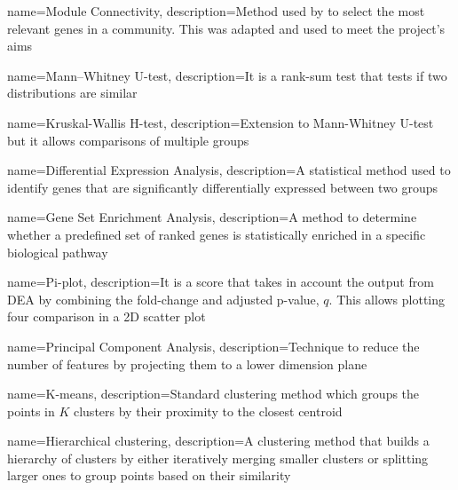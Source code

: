 {
    name=Module Connectivity,
    description={Method used by \citep{Care2019-ij} to select the most relevant genes in a community. This was adapted and used to meet the project's aims}
}

{
    name=Mann–Whitney U-test,
    description={It is a rank-sum test that tests if two distributions are similar}
}

{
    name=Kruskal-Wallis H-test,
    description={Extension to Mann-Whitney U-test but it allows comparisons of multiple groups}
}

{
    name=Differential Expression Analysis,
    description={A statistical method used to identify genes that are significantly differentially expressed between two groups}
}

{
    name=Gene Set Enrichment Analysis,
    description={A method to determine whether a predefined set of ranked genes is statistically enriched in a specific biological pathway}
}

{
    name=Pi-plot,
    description={It is a score that takes in account the output from DEA by combining the fold-change and adjusted p-value, $q$. This allows plotting four comparison in a 2D scatter plot}
}


{
    name=Principal Component Analysis,
    description={Technique to reduce the number of features by projecting them to a lower dimension plane}
}

{
    name=K-means,
    description={Standard clustering method which groups the points in $K$ clusters by their proximity to the closest centroid}
}

{
    name=Hierarchical clustering,
    description={A clustering method that builds a hierarchy of clusters by either iteratively merging smaller clusters or splitting larger ones to group points based on their similarity}
}